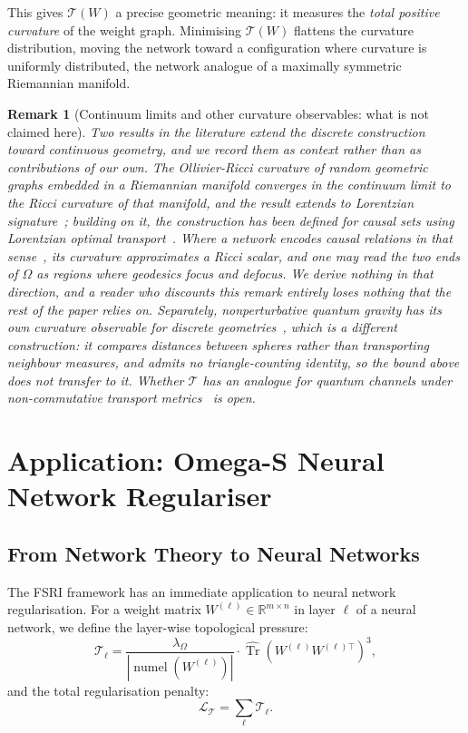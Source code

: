 \documentclass[11pt,a4paper]{article}
\newtheorem{remark}{Remark}
\begin{document}
This gives $\mathcal{T}(W)$ a precise geometric meaning: it measures
the \emph{total positive curvature} of the weight graph. Minimising
$\mathcal{T}(W)$ flattens the curvature distribution, moving the
network toward a configuration where curvature is uniformly
distributed, the network analogue of a maximally symmetric
Riemannian manifold.

\begin{remark}[Continuum limits and other curvature observables: what is
not claimed here]
\label{rem:continuum}
Two results in the literature extend the discrete construction toward
continuous geometry, and we record them as context rather than as
contributions of our own. The Ollivier-Ricci curvature of random geometric
graphs embedded in a Riemannian manifold converges in the continuum limit to
the Ricci curvature of that manifold, and the result extends to Lorentzian
signature~\cite{vanderhoorn2021}; building on it, the construction has been
defined for causal sets using Lorentzian optimal
transport~\cite{orc_causalsets2026}. Where a network encodes causal relations
in that sense~\cite{bombelli1987}, its curvature approximates a Ricci scalar,
and one may read the two ends of $\Omega$ as regions where geodesics focus
and defocus. We derive nothing in that direction, and a reader who discounts
this remark entirely loses nothing that the rest of the paper relies on.
Separately, nonperturbative quantum gravity has its own curvature observable
for discrete geometries~\cite{klitgaard2018a,klitgaard2018b,klitgaard2020},
which is a different construction: it compares distances between spheres
rather than transporting neighbour measures, and admits no triangle-counting
identity, so the bound above does not transfer to it. Whether $\mathcal{T}$
has an analogue for quantum channels under non-commutative transport
metrics~\cite{gao2021} is open.
\end{remark}
\section{Application: Omega-S Neural Network Regulariser}
\label{sec:omega_s}

\subsection{From Network Theory to Neural Networks}

The FSRI framework has an immediate application to neural network
regularisation. For a weight matrix $W^{(\ell)} \in \mathbb{R}^{m \times n}$
in layer $\ell$ of a neural network, we define the layer-wise
topological pressure:
\begin{equation}
\mathcal{T}_\ell = \frac{\lambda_\Omega}{|\operatorname{numel}(W^{(\ell)})|}
\cdot \widehat{\operatorname{Tr}}(W^{(\ell)}W^{(\ell)\top})^3,
\label{eq:omega_layer}
\end{equation}
and the total regularisation penalty:
\begin{equation}
\mathcal{L}_\mathcal{T} = \sum_\ell \mathcal{T}_\ell.
\label{eq:total_penalty}
\end{equation}
\end{document}

